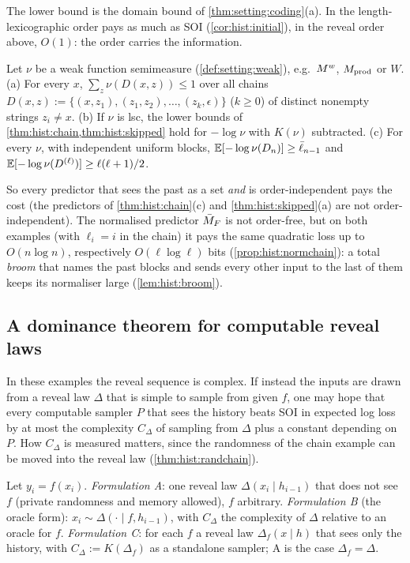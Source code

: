The lower bound is the domain bound of \cref{thm:setting:coding}(a). In the length-lexicographic order \SFIhist{} pays as much as SOI (\cref{cor:hist:initial}), in the reveal order above, $O(1)$: the order carries the information.

\begin{proposition}\label{prop:hist:orderfree}
Let $\nu$ be a weak function semimeasure (\cref{def:setting:weak}), e.g.\ $M^{w}$, $M_{\mathrm{prod}}$ or $W$. (a) For every $x$, $\sum_z\nu(D(x,z))\le1$ over all chains $D(x,z):=\{(x,z_1),(z_1,z_2),\dots,(z_k,\epsilon)\}$ ($k\ge0$) of distinct nonempty strings $z_i\ne x$. (b) If $\nu$ is lsc, the lower bounds of \cref{thm:hist:chain,thm:hist:skipped} hold for $-\log\nu$ with $K(\nu)$ subtracted. (c) For every $\nu$, with independent uniform blocks, $\mathbb{E}[-\log\nu(D_n)]\ge\bar\ell_{n-1}$ and $\mathbb{E}[-\log\nu(D^{(\ell)})]\ge\ell(\ell+1)/2$.
\end{proposition}

So every predictor that sees the past as a set \emph{and} is order-independent pays the cost (the predictors of \cref{thm:hist:chain}(c) and \cref{thm:hist:skipped}(a) are not order-independent). The normalised predictor $\bar{M}_{F}$ is not order-free, but on both examples (with $\ell_i=i$ in the chain) it pays the same quadratic loss up to $O(n\log n)$, respectively $O(\ell\log\ell)$ bits (\cref{prop:hist:normchain}): a total \emph{broom} that names the past blocks and sends every other input to the last of them keeps its normaliser large (\cref{lem:hist:broom}).

\subsection{A dominance theorem for computable reveal laws}\label{sec:hist:thm1}

In these examples the reveal sequence is complex. If instead the inputs are drawn from a reveal law $\Delta$ that is simple to sample from given $f$, one may hope that every computable sampler $P$ that sees the history beats SOI in expected log loss by at most the complexity $C_\Delta$ of sampling from $\Delta$ plus a constant depending on $P$. How $C_\Delta$ is measured matters, since the randomness of the chain example can be moved into the reveal law (\cref{thm:hist:randchain}).

\begin{definition}\label{def:hist:readings}
Let $y_i=f(x_i)$. \emph{Formulation A}: one reveal law $\Delta(x_i\mid h_{i-1})$ that does not see $f$ (private randomness and memory allowed), $f$ arbitrary. \emph{Formulation B} (the oracle form): $x_i\sim\Delta(\cdot\mid f,h_{i-1})$, with $C_\Delta$ the complexity of $\Delta$ relative to an oracle for $f$. \emph{Formulation C}: for each $f$ a reveal law $\Delta_f(x\mid h)$ that sees only the history, with $C_\Delta:=K(\Delta_f)$ as a standalone sampler; A is the case $\Delta_f=\Delta$.
\end{definition}

